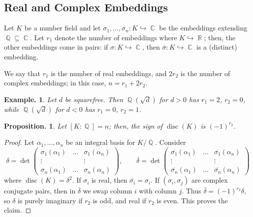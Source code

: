 \documentclass[11pt, a4paper]{memoir}
\DeclareMathOperator{\Q}{{\mathbb{Q}}}
\DeclareMathOperator{\R}{{\mathbb{R}}}
\DeclareMathOperator{\C}{{\mathbb{C}}}
\newcommand{\hto}[0]{\ensuremath{\hookrightarrow}}
\newcommand{\ol}[1]{\ensuremath{\overline{#1}}}
\theoremstyle{change}
\newtheorem{proposition}[theorem]{Proposition.}
\theoremstyle{plain}
\theoremstyle{nonumberplain}
\newtheorem{example}{Example.}
\newtheorem{proof}{Proof}
\DeclareMathOperator{\disc}{disc}
\numberwithin{equation}{section}
\begin{document}
\subsection{Real and Complex Embeddings}
Let $K$ be a number field and let $\sigma_1,\ldots,\sigma_n:K\hto\C$ be the embeddings extending $\Q\subseteq\C$.
Let $r_1$ denote the number of embeddings where $K\hto\R$; then, the other embeddings come in pairs: if $\sigma:K\hto\C$, then $\ol{\sigma}:K\hto\C$ is a (distinct) embedding.

We say that $r_1$ is the number of real embeddings, and $2r_2$ is the number of complex embeddings; in this case, $n=r_1+2r_2$.
\begin{example}
    Let $d$ be squarefree.
    Then $\Q(\sqrt{d})$ for $d>0$ has $r_1=2$, $r_2=0$, while $\Q(\sqrt{d})$ for $d<0$ has $r_1=0$, $r_2=1$.
\end{example}
\begin{proposition}
    Let $[K:\Q]=n$; then, the sign of $\disc(K)$ is $(-1)^{r_2}$.
\end{proposition}
\begin{proof}
    Let $\alpha_1,\ldots,\alpha_n$ be an integral basis for $K/\Q$.
    Consider
    \begin{equation*}
        \delta=\det
        \begin{pmatrix}
            \sigma_1(\alpha_1)&\hdots&\sigma_1(\alpha_n)\\
            \vdots&&\vdots\\
            \sigma_n(\alpha_1)&\hdots&\sigma_n(\alpha_n)
        \end{pmatrix}
        ,\qquad
        \ol{\delta}=\det
        \begin{pmatrix}
            \ol{\sigma_1}(\alpha_1)&\hdots&\ol{\sigma_1}(\alpha_n)\\
            \vdots&&\vdots\\
            \ol{\sigma_n}(\alpha_1)&\hdots&\ol{\sigma_n}(\alpha_n)
        \end{pmatrix}
    \end{equation*}
    where $\disc(K)=\delta^2$.
    If $\sigma_i$ is real, then $\ol{\sigma_i}=\sigma_i$.
    If $(\sigma_i,\sigma_j)$ are complex conjugate pairs, then in $\ol{\delta}$ we swap column $i$ with column $j$.
    Thus $\ol{\delta}=(-1)^{r_2}\delta$, so $\delta$ is purely imaginary if $r_2$ is odd, and real if $r_2$ is even.
    This proves the claim.
\end{proof}
\end{document}
